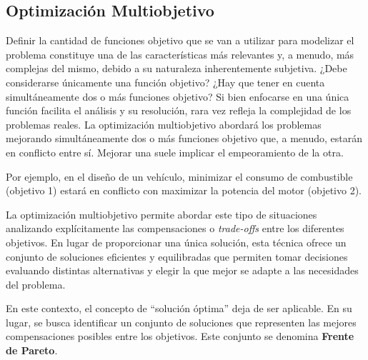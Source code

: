 \documentclass[12pt,a4paper]{book}
\begin{document}
\subsection{Optimización Multiobjetivo}

Definir la cantidad de funciones objetivo que se van a utilizar para modelizar el problema constituye una de las características más relevantes y, a menudo, más complejas del mismo, debido a su naturaleza inherentemente subjetiva.
¿Debe considerarse únicamente una función objetivo? ¿Hay que tener en cuenta simultáneamente 
dos o más funciones objetivo? Si bien enfocarse en una única función facilita el análisis y su resolución, rara vez refleja la complejidad de los problemas reales. La optimización multiobjetivo
abordará los problemas mejorando simultáneamente dos o más funciones objetivo que, a menudo, estarán en conflicto entre sí. Mejorar una suele implicar el empeoramiento de la otra.

Por ejemplo, en el diseño de un vehículo, minimizar el consumo de combustible (objetivo 1) estará en conflicto con maximizar la potencia del motor (objetivo 2).

La optimización multiobjetivo permite abordar este tipo de situaciones analizando
explícitamente las compensaciones o \textit{trade-offs} entre los diferentes objetivos. En lugar de proporcionar una única solución, esta técnica ofrece un conjunto de soluciones eficientes y equilibradas que permiten
tomar decisiones evaluando distintas alternativas y elegir la que mejor se adapte a las necesidades del problema.

En este contexto, el concepto de “solución óptima” deja de ser aplicable. En su lugar, se busca identificar un conjunto de soluciones que representen las mejores compensaciones posibles entre los objetivos. Este conjunto se denomina \textbf{Frente de Pareto}.
\end{document}
